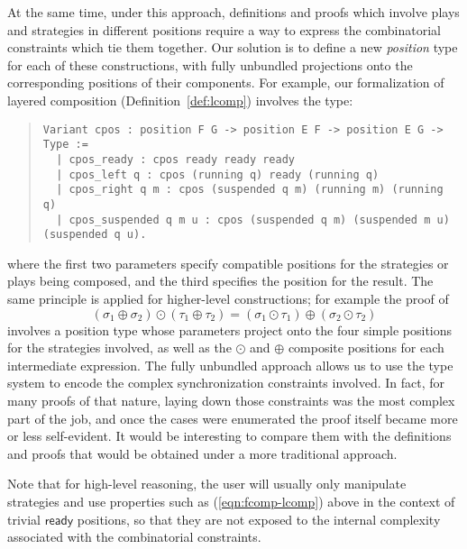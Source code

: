 \documentclass[acmsmall,nonacm]{acmart}
\newcommand{\kw}[1]{\ensuremath{ \mathsf{#1} }}
\begin{document}
At the same time,
under this approach,
definitions and proofs which involve
plays and strategies in different positions
require a way to express the combinatorial constraints
which tie them together.
Our solution is to define a new \emph{position} type
for each of these constructions,
with fully unbundled projections onto
the corresponding positions of their components.
For example,
our formalization of layered composition (Definition~\ref{def:lcomp})
involves the type:
\begin{quote}\footnotesize
\verb!Variant cpos : position F G -> position E F -> position E G -> Type :=! \\
\verb!  | cpos_ready : cpos ready ready ready! \\
\verb!  | cpos_left q : cpos (running q) ready (running q)! \\
\verb!  | cpos_right q m : cpos (suspended q m) (running m) (running q)! \\
\verb!  | cpos_suspended q m u : cpos (suspended q m) (suspended m u) (suspended q u).!
\end{quote}
where the first two parameters specify compatible positions for
the strategies or plays being composed,
and the third specifies the position for the result.
The same principle is applied for higher-level constructions;
for example the proof of
\begin{equation} \label{eqn:fcomp-lcomp}
  (\sigma_1 \oplus \sigma_2) \odot (\tau_1 \oplus \tau_2) =
  (\sigma_1 \odot \tau_1) \oplus (\sigma_2 \odot \tau_2)
\end{equation}
involves a position type whose parameters project onto
the four simple positions for the strategies involved,
as well as the $\odot$ and $\oplus$ composite positions
for each intermediate expression.
The fully unbundled approach allows us to use the type system
to encode the complex synchronization constraints involved.
In fact,
for many proofs of that nature,
laying down those constraints was the most complex part of the job,
and once the cases were enumerated
the proof itself became more or less self-evident.
It would be interesting to compare them with
the definitions and proofs that would be obtained
under a more traditional approach.

Note that for high-level reasoning,
the user will usually only manipulate strategies and
use properties such as (\ref{eqn:fcomp-lcomp}) above
in the context of trivial $\kw{ready}$ positions,
so that they are not exposed to the internal complexity
associated with the combinatorial constraints.
\end{document}
